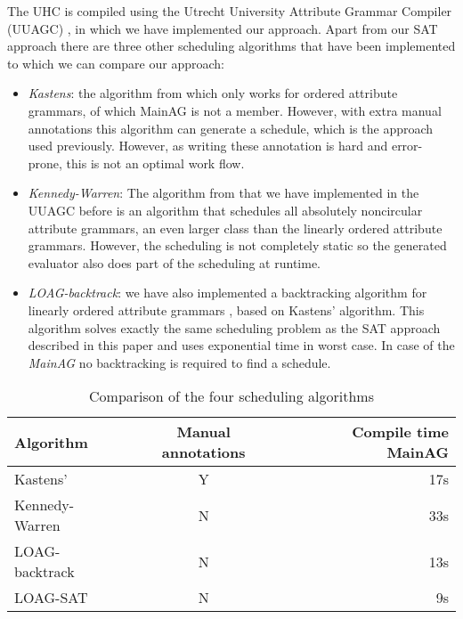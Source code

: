 \documentclass{llncs}
\begin{document}
The UHC is compiled using the Utrecht University Attribute Grammar Compiler (UUAGC) \cite{combinator-languages}, in which we have implemented our approach. Apart from our SAT approach there are three other scheduling algorithms that have been implemented to which we can compare our approach:

\begin{itemize}
\item \emph{Kastens}: the algorithm from \cite{kastens80} which only works for ordered attribute grammars, of which MainAG is not a member. However, with extra manual annotations this algorithm can generate a schedule, which is the approach used previously. However, as writing these annotation is hard and error-prone, this is not an optimal work flow.
\item \emph{Kennedy-Warren}: The algorithm from \cite{kennedywarren76} that we have implemented in the UUAGC before \cite{bransen2012} is an algorithm that schedules all absolutely noncircular attribute grammars, an even larger class than the linearly ordered attribute grammars. However, the scheduling is not completely static so the generated evaluator also does part of the scheduling at runtime. 
\item \emph{LOAG-backtrack}: we have also implemented a backtracking algorithm for linearly ordered attribute grammars \cite{Binsbergen:2015}, based on Kastens' algorithm. This algorithm solves exactly the same scheduling problem as the SAT approach described in this paper and uses exponential time in worst case. In case of the \emph{MainAG} no backtracking is required to find a schedule.
\end{itemize} 

\begin{table}
  \begin{center}
    \begin{tabular}{l || c || r}
      Algorithm   &   Manual annotations   &  Compile time MainAG \\
      \hline
      Kastens'                &   Y           &   17s \\
      Kennedy-Warren  &   N           &   33s \\
      LOAG-backtrack  &   N           &   13s \\
      LOAG-SAT           &   N           &   9s \\
    \end{tabular}
  \end{center}
  \caption{Comparison of the four scheduling algorithms}
  \label{tab:algo-comparison}
\end{table}
\end{document}
